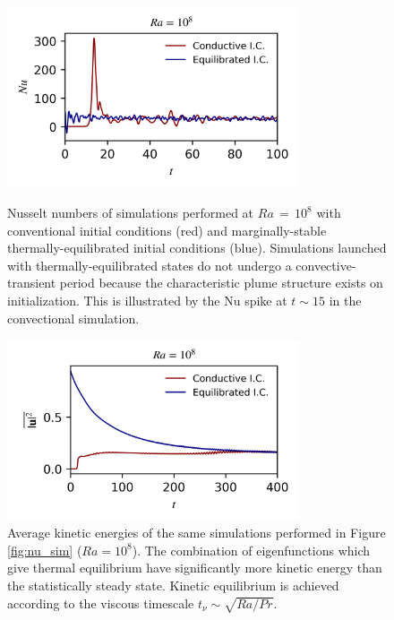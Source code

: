 \documentclass[reprint,amsmath,amssymb,aps]{revtex4-1}
\newcommand\Nu{\mathrm{Nu}}
\begin{document}
\begin{figure}[t]
    \begin{minipage}[t]{3.4in}
        \centering
        \includegraphics[width=3.4in]{sim_eq_nu.png}
        \caption{Nusselt numbers of simulations performed at $Ra \, = \, 10^8$ with conventional initial conditions (red) and marginally-stable thermally-equilibrated initial conditions (blue). Simulations launched with thermally-equilibrated states do not undergo a convective-transient period because the characteristic plume structure exists on initialization. This is illustrated by the $\Nu$ spike at $t \sim 15$ in the convectional simulation.}
        \label{fig:nu_sim}
    \end{minipage}
    \hfill
    \begin{minipage}[t]{3.4in}
        \centering
        \includegraphics[width=3.4in]{sim_eq_ke.png}
        \caption{Average kinetic energies of the same simulations performed in Figure \ref{fig:nu_sim} ($Ra = 10^8$). The combination of eigenfunctions which give thermal equilibrium have significantly more kinetic energy than the statistically steady state. Kinetic equilibrium is achieved according to the viscous timescale $t_{\nu} \sim \sqrt{Ra / Pr}$.}
        \label{fig:ke_sim}
    \end{minipage}
\end{figure}
\end{document}

